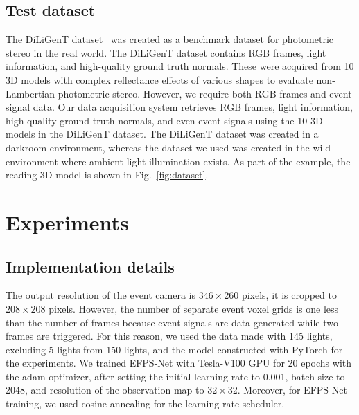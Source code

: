\documentclass[preprint,12pt,authoryear]{elsarticle}
\begin{document}
\subsection{Test dataset}
The DiLiGenT dataset~\citep{shi2016benchmark} was created as a benchmark dataset for photometric stereo in the real world. The DiLiGenT dataset contains RGB frames, light information, and high-quality ground truth normals. These were acquired from 10 3D models with complex reflectance effects of various shapes to evaluate non-Lambertian photometric stereo. However, we require both RGB frames and event signal data. Our data acquisition system retrieves RGB frames, light information, high-quality ground truth normals, and even event signals using the 10 3D models in the DiLiGenT dataset. The DiLiGenT dataset was created in a darkroom environment, whereas the dataset we used was created in the wild environment where ambient light illumination exists. As part of the example, the reading 3D model is shown in Fig.~\ref{fig:dataset}.

\section{Experiments}
\subsection{Implementation details}
The output resolution of the event camera is $346 \times 260$ pixels, it is cropped to $208 \times 208$ pixels. However, the number of separate event voxel grids is one less than the number of frames because event signals are data generated while two frames are triggered. For this reason, we used the data made with 145 lights, excluding 5 lights from 150 lights, and the model constructed with PyTorch for the experiments. We trained EFPS-Net with Tesla-V100 GPU for 20 epochs with the adam optimizer, after setting the initial learning rate to 0.001, batch size to 2048, and resolution of the observation map to $32 \times 32$. Moreover, for EFPS-Net training, we used cosine annealing for the learning rate scheduler.
\end{document}
